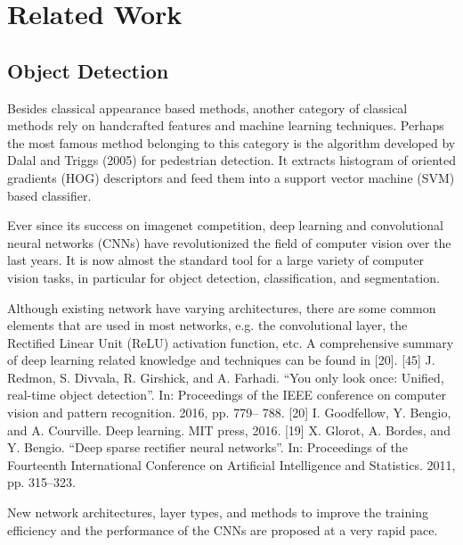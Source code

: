 \documentclass[a4paper]{report}
\begin{document}
\section{Related Work}

\subsection{Object Detection}

Besides classical appearance based methods, another category of classical methods rely on handcrafted features and machine learning techniques. Perhaps the most famous method belonging to this category is the algorithm developed by Dalal
and Triggs (2005) for pedestrian detection. It extracts histogram of oriented gradients (HOG) descriptors and feed them into a support vector machine (SVM) based classifier.




Ever since its success on imagenet competition, deep learning and convolutional neural networks (CNNs) have revolutionized the field of computer vision over the last
years. It is now almost the standard tool for a large variety of computer vision tasks, in particular for object detection, classification, and segmentation. 

Although existing network have varying architectures, there are some common elements that are used in most networks, e.g. the convolutional layer, the Rectified Linear Unit (ReLU) activation function, etc. A comprehensive summary of deep learning related knowledge and techniques can be found in [20].
[45] J. Redmon, S. Divvala, R. Girshick, and A. Farhadi. “You only look
once: Unified, real-time object detection”. In: Proceedings of the IEEE
conference on computer vision and pattern recognition. 2016, pp. 779–
788.
[20] I. Goodfellow, Y. Bengio, and A. Courville. Deep learning. MIT press,
2016.
[19] X. Glorot, A. Bordes, and Y. Bengio. “Deep sparse rectifier neural networks”.
In: Proceedings of the Fourteenth International Conference on
Artificial Intelligence and Statistics. 2011, pp. 315–323.



New network architectures, layer types, and methods to improve the training efficiency and the performance of the CNNs are proposed at a very rapid pace.
\end{document}
